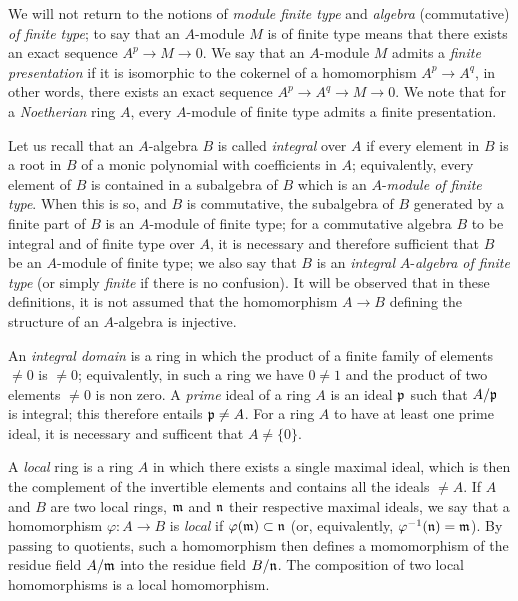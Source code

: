 \documentclass[../main.tex]{subfiles}
\begin{document}
\begin{cx}[1.0.5]
We will not return to the notions of \emph{module finite type} and
\emph{algebra} (commutative) \emph{of finite type}; to say that an $A$-module $M$
is of finite type means that there exists an exact sequence $A^p\to M\to 0$. We say that
an $A$-module $M$ admits a \emph{finite presentation} if it is isomorphic to the cokernel
of a homomorphism $A^p\to A^q$, in other words, there exists an exact sequence
$A^p\to A^q\to M\to 0$. We note that for a \emph{Noetherian} ring $A$, every $A$-module
of finite type admits a finite presentation.

Let us recall that an $A$-algebra $B$ is called \emph{integral} over $A$ if every element
in $B$ is a root in $B$ of a monic polynomial with coefficients in $A$; equivalently, every
element of $B$ is contained in a subalgebra of $B$ which is an $A$-\emph{module of finite type}.
When this is so, and $B$ is commutative, the subalgebra of $B$ generated by a finite part of
$B$ is an $A$-module of finite type; for a commutative algebra $B$ to be integral and of finite
type over $A$, it is necessary and therefore sufficient that $B$ be an $A$-module of finite
type; we also say that $B$ is an \emph{integral} $A$-\emph{algebra of finite type} (or
simply \emph{finite} if there is no confusion). It will be observed that in these definitions,
it is not assumed that the homomorphism $A\to B$ defining the structure of an $A$-algebra
is injective.
\end{cx}

\begin{cx}[1.0.6]
An \emph{integral domain} is a ring in which the product of a finite family of elements
$\neq 0$ is $\neq 0$; equivalently, in such a ring we have $0\neq 1$ and the product of
two elements $\neq 0$ is non zero. A \emph{prime} ideal of a ring $A$ is an ideal $\mathfrak{p}$
such that $A/\mathfrak{p}$ is integral; this therefore entails $\mathfrak{p}\neq A$. For a ring $A$ to
have at least one prime ideal, it is necessary and sufficent that $A\neq\{0\}$.
\end{cx}

\begin{cx}[1.0.7]
A \emph{local} ring is a ring $A$ in which there exists a single maximal ideal, which is then
the complement of the invertible elements and contains all the ideals $\neq A$. If $A$ and $B$
are two local rings, $\mathfrak{m}$ and $\mathfrak{n}$ their respective maximal ideals, we say that a
homomorphism $\varphi:A\to B$ is \emph{local} if $\varphi(\mathfrak{m})\subset\mathfrak{n}$ (or, equivalently,
$\varphi^{-1}(\mathfrak{n})=\mathfrak{m}$). By passing to quotients, such a homomorphism then defines
a momomorphism of the residue field $A/\mathfrak{m}$ into the residue field $B/\mathfrak{n}$. The
composition of two local homomorphisms is a local homomorphism.
\end{cx}
\end{document}
